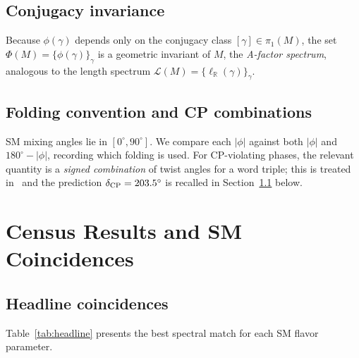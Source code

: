 \documentclass[11pt,a4paper]{article}
\newcommand{\pioneM}{\pi_1(M)}
\newcommand{\degr}{^{\circ}}
\begin{document}
\subsection{Conjugacy invariance}

Because $\phi(\gamma)$ depends only on the conjugacy class $[\gamma]\in\pioneM$,
the set $\Phi(M)=\{\phi(\gamma)\}_\gamma$ is a geometric invariant of $M$,
the \emph{A-factor spectrum}, analogous to the length spectrum
$\mathcal{L}(M)=\{\ell_{\mathbb{R}}(\gamma)\}_\gamma$.

\subsection{Folding convention and CP combinations}

SM mixing angles lie in $[0\degr,90\degr]$.
We compare each $|\phi|$ against both $|\phi|$ and $180\degr-|\phi|$,
recording which folding is used.
For CP-violating phases, the relevant quantity is a \emph{signed combination}
of twist angles for a word triple; this is treated in~\cite{GentryCP} and
the prediction $\delta_{\rm CP}=203.5\degr$ is recalled in
Section~\ref{sec:headline} below.

\section{Census Results and SM Coincidences}
\label{sec:results}

\subsection{Headline coincidences}
\label{sec:headline}

Table~\ref{tab:headline} presents the best spectral match for each SM flavor
parameter.
\end{document}
